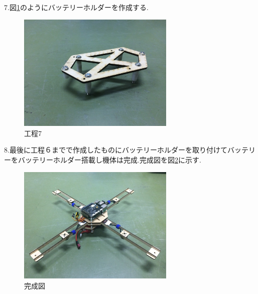\documentclass[12pt,oneside]{sotsuken_paper}
\begin{document}
7.図\ref{fig:kitai5}のようにバッテリーホルダーを作成する.

\begin{figure}[htbp]
	\begin{center}
		\includegraphics[width=75mm]{image/kitai/kitai5.jpg}
		\caption{工程7}
		\label{fig:kitai5}
	\end{center}
\end{figure}


8.最後に工程６までで作成したものにバッテリーホルダーを取り付けてバッテリーをバッテリーホルダー搭載し機体は完成.完成図を図\ref{fig:kitai}に示す.

\begin{figure}[htbp]
	\begin{center}
		\includegraphics[width=75mm]{image/kitai/kitai.jpg}
		\caption{完成図}
		\label{fig:kitai}
	\end{center}
\end{figure}
\end{document}
